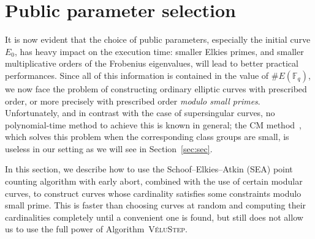 \documentclass{llncs}
\newcommand{\F}{\mathbb{F}}
\newcommand{\algstyle}[1]{\textsc{#1}}
\begin{document}

\section{Public parameter selection}
\label{sec:initcurve}

It is now evident that the choice of public parameters, especially
the initial curve $E_0$, has heavy impact on the execution time:
smaller Elkies primes,
and smaller multiplicative orders of the Frobenius eigenvalues, will
lead to better practical performances. Since all of this information
is contained in the value of $\# E(\F_q)$, we now face the problem
of constructing ordinary elliptic curves with prescribed
order, or more precisely with prescribed order \emph{modulo small
primes}. Unfortunately, and in contrast with the case of
supersingular curves, no polynomial-time method to achieve this 
is known in general; the CM method~\cite{AtkinMorain93,Sutherland2012},
which solves this problem
when the corresponding class groups are small, is useless in our
setting as we will see in Section~\ref{sec:sec}.

In this section, we describe how to use the Schoof--Elkies--Atkin (SEA) point counting
algorithm with early abort, combined with the use of certain modular curves,
to construct curves whose cardinality satisfies some constraints
modulo small prime.
This is faster than choosing curves at random and computing their cardinalities
completely until a convenient one is found, but still does not allow us
to use the full power of Algorithm~\algstyle{VéluStep}.
\end{document}
